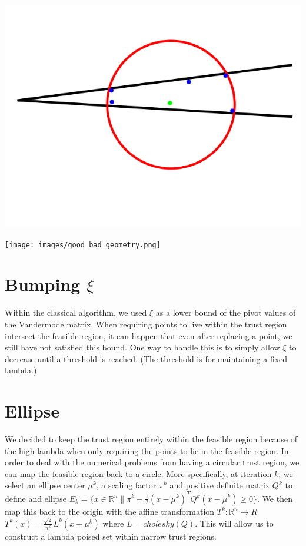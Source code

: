 \documentclass{article}
\begin{document}
\includegraphics[scale=0.4]{bad_lambda.png}


\texttt{[image: images/good\_bad\_geometry.png]}

\section{Bumping $\xi$}


Within the classical algorithm, we used $\xi$ as a lower bound of the pivot values of the Vandermode matrix.
When requiring points to live within the trust region intersect the feasible region, it can happen that even after replacing a point, we still have not satisfied this bound.
One way to handle this is to simply allow $\xi$ to decrease until a threshold is reached.
(The threshold is for maintaining a fixed lambda.)


    
\section{Ellipse}


We decided to keep the trust region entirely within the feasible region because of the high lambda when only requiring the points to lie in the feasible region.
In order to deal with the numerical problems from having a circular trust region, we can map the feasible region back to a circle.
More specifically, at iteration $k$, we select an ellipse center $\mu^k$, a scaling factor $\pi^k$ and positive definite matrix $Q^k$ to define and ellipse
$E_k = \{x \in \mathbb R^n \| \pi^k - \frac 1 2 (x - \mu^{k})^TQ^{k}(x - \mu^{k}) \ge 0 \}$.
We then map this back to the origin with the affine transformation $T^k : \mathbb R^n \to R$ $T^k(x) = \frac {\sqrt{2}}{\pi^k} L^k(x-\mu^k)$ where $L = cholesky(Q)$.
This will allow us to construct a lambda poised set within narrow trust regions.
\end{document}
